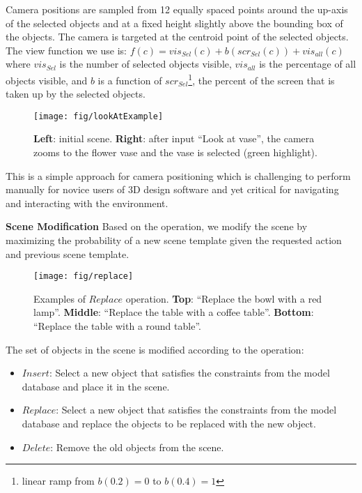 \documentclass{sigchi}
\begin{document}
Camera positions are sampled from 12 equally spaced points around the up-axis of the selected objects and at a fixed height slightly above the bounding box of the objects.  The camera is targeted at the centroid point of the selected objects.  The view function we use is: $f(c) = \textit{vis}_\textit{Sel}(c) + b(\textit{scr}_\textit{Sel}(c))+ \textit{vis}_\textit{all}(c)$
where $\textit{vis}_\textit{Sel}$ is the number of selected objects visible, $\textit{vis}_\textit{all}$ is the percentage of all objects visible, and $b$ is a function of $\textit{scr}_\textit{Sel}$\footnote{linear ramp from $b(0.2)=0$ to $b(0.4)=1$}, the percent of the screen that is taken up by the selected objects.

\begin{figure}
  \texttt{[image: fig/lookAtExample]}
  \caption{\textbf{Left}: initial scene. \textbf{Right}: after input ``Look at vase'', the camera zooms to the flower vase and the vase is selected (green highlight).}
  \label{fig:lookAtExample}
\end{figure}

This is a simple approach for camera positioning which is challenging to perform manually for novice users of 3D design software and yet critical for navigating and interacting with the environment.

\textbf{Scene Modification}
Based on the operation, we modify the scene by maximizing the probability of a new scene template given the requested action and previous scene template.

\begin{figure}
  \texttt{[image: fig/replace]}
  \caption{Examples of $Replace$ operation. \textbf{Top}: ``Replace the bowl with a red lamp''. \textbf{Middle}: ``Replace the table with a coffee table''. \textbf{Bottom}: ``Replace the table with a round table''.}
  \label{fig:replace}
\end{figure}

The set of objects in the scene is modified according to the operation:
\vspace{-.5em}
\begin{itemize}[topsep=0pt,noitemsep,parsep=0pt,partopsep=0pt]
\item $Insert$: Select a new object that satisfies the constraints from the model database and place it in the scene.
\item $Replace$: Select a new object that satisfies the constraints from the model database and replace the objects to be replaced with the new object.
\item $Delete$: Remove the old objects from the scene.
\end{itemize}
\end{document}
